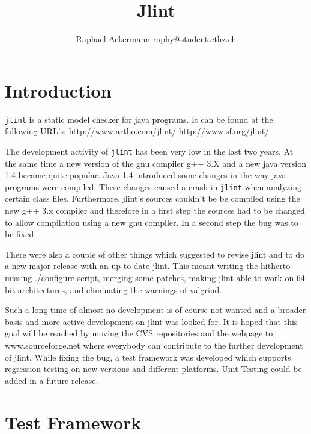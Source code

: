 \documentclass[11pt,twoside,a4paper,draft]{article}
\author{Raphael Ackermann raphy@student.ethz.ch}
\title{Jlint}
\begin{document}
\maketitle

\newpage

\tableofcontents

\newpage

\section {Introduction}

\texttt{jlint} is a static model checker for java programs. \newline
It can be found at the following URL's: 
http://www.artho.com/jlint/ \newline
http://www.sf.org/jlint/ \newline

The development activity of \texttt{jlint} has been very low in the last two years.
At the same time a new version of the gnu compiler g++ 3.X and a new java
version 1.4 became quite popular. Java 1.4 introduced some changes in the way
java programs were compiled. These changes caused a crash in \texttt{jlint}
when analyzing certain class files. Furthermore, jlint's sources couldn't be
be compiled using the new g++ 3.x compiler and therefore in a first step the
sources had to be changed to allow compilation using a new gnu compiler. In a
second step the bug was to be fixed.

There were also a couple of other things which suggested to revise jlint and
to do a new major release with an up to date jlint. This meant writing
the hitherto missing ./configure script, merging some patches, making 
jlint able to work on 64 bit architectures, and eliminating the warnings
of valgrind.

Such a long time of almost no development is of course not wanted and
a broader basis and more active development on jlint was looked for.
It is hoped that this goal will be reached by moving the CVS repositories 
and the webpage to www.sourceforge.net where everybody can contribute 
to the further development of jlint.
While fixing the bug, a test framework was developed which supports
regression testing on new versions and different platforms.
Unit Testing could be added in a future release.

\section {Test Framework}
\end{document}
